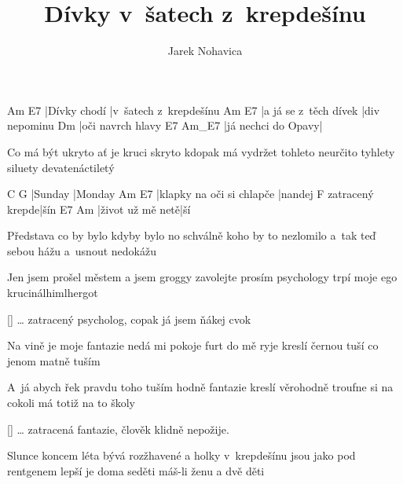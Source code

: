 \documentclass{song}
\author{Jarek Nohavica}
\title{Dívky v~šatech z~krepdešínu}
\begin{document}
\begin{multicols}{2}
\strophe
Am           E7
|Dívky chodí |v~šatech z~krepdešínu
Am                    E7
|a já se z~těch dívek |div nepominu
Dm
|oči navrch hlavy
E7                 Am_E7
|já nechci do Opavy|
\endstrophe

\columnbreak

\strophe*
Co má být ukryto ať je kruci skryto
kdopak má vydržet tohleto neurčito
tyhlety siluety
devatenáctiletý
\endstrophe
\end{multicols}

C       G
|Sunday |Monday
Am                        E7
|klapky na oči si chlapče |nandej
                F
zatracený krepde|šín
E7               Am
|život už mě netě|ší
\endstrophe

\begin{multicols}{2}
\strophe*
Představa co by bylo kdyby bylo
no schválně koho by to nezlomilo
a~tak teď sebou hážu
a~usnout nedokážu
\endstrophe

\strophe*
Jen jsem prošel městem a jsem groggy
zavolejte prosím psychology
trpí moje ego
krucinálhimlhergot
\endstrophe
\end{multicols}

\ref{} \ldots{} zatracený psycholog, copak já jsem ňákej cvok

\begin{multicols}{2}
\strophe*
Na vině je moje fantazie
nedá mi pokoje furt do mě ryje
kreslí černou tuší
co jenom matně tuším
\endstrophe

\strophe*
A~já abych řek pravdu toho tuším hodně
fantazie kreslí věrohodně
troufne si na cokoli
má totiž na to školy
\endstrophe
\end{multicols}

\ref{} \ldots{} zatracená fantazie, člověk klidně nepožije.

\strophe*
Slunce koncem léta bývá rozžhavené
a holky v~krepdešínu jsou jako pod rentgenem
lepší je doma seděti
máš-li ženu a dvě děti
\endstrophe
\end{document}
